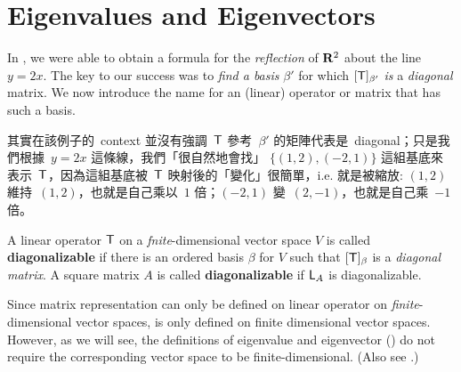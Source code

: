 \section{Eigenvalues and Eigenvectors} \label{sec 5.1}

In , we were able to obtain a formula for the \emph{reflection} of \(\mathbf{R}^2\) about the line \(y = 2x\).
The key to our success was to \emph{find a basis} \(\beta'\) for which \([\textsf{T}]_{\beta'}\) \emph{is} a \emph{diagonal} matrix.
We now introduce the name for an (linear) operator or matrix that has such a basis.

\begin{note}
其實在該例子的\ context 並沒有強調\ \(\textsf{T}\) 參考\ \(\beta'\) 的矩陣代表是\ diagonal；只是我們根據\ \(y = 2x\) 這條線，我們「很自然地會找」 \(\{ (1,2), (-2, 1) \}\) 這組基底來表示\ \(\textsf{T}\)，因為這組基底被\ \(\textsf{T}\) 映射後的「變化」很簡單，i.e. 就是被縮放: \((1,2)\) 維持\ \((1,2)\)，也就是自己乘以\ \(1\) 倍；\((-2,1)\) 變\ \((2,-1)\)，也就是自己乘\ \(-1\) 倍。
\end{note}

\begin{definition} \label{def 5.1}
A linear operator \(\textsf{T}\) on a \emph{fnite}-dimensional vector space \(V\) is called \textbf{diagonalizable} if there is an ordered basis \(\beta\) for \(V\) such that \([\textsf{T}]_{\beta}\) is a \emph{diagonal matrix}.
A square matrix \(A\) is called \textbf{diagonalizable} if \(\textsf{L}_A\) is diagonalizable.
\end{definition}

\begin{remark} \label{remark 5.1.1}
\sloppy Since matrix representation can only be defined on linear operator on \emph{finite}-dimensional vector spaces,
 is only defined on finite dimensional vector spaces.
However, as we will see, the definitions of eigenvalue and eigenvector () do not require the corresponding vector space to be finite-dimensional.
(Also see .)
\end{remark}

